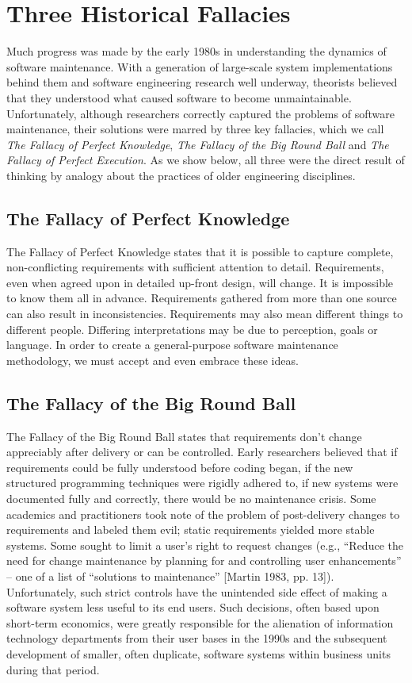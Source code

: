 \section{Three Historical Fallacies}

Much progress was made by the early 1980s in understanding the dynamics of software maintenance.  With a generation of large-scale system implementations behind them and software engineering research well underway, theorists believed that they understood what caused software to become unmaintainable.  Unfortunately, although researchers correctly captured the problems of software maintenance, their solutions were marred by three key fallacies, which we call \textit{The Fallacy of Perfect Knowledge}, \textit{The Fallacy of the Big Round Ball} and \textit{The Fallacy of Perfect Execution}.  As we show below, all three were the direct result of thinking by analogy about the practices of older engineering disciplines.


\subsection{The Fallacy of Perfect Knowledge}

The Fallacy of Perfect Knowledge states that it is possible to capture complete, non-conflicting requirements with sufficient attention to detail.  Requirements, even when agreed upon in detailed up-front design, will change.  It is impossible to know them all in advance.  Requirements gathered from more than one source can also result in inconsistencies.  Requirements may also mean different things to different people.  Differing interpretations may be due to perception, goals or language.  In order to create a general-purpose software maintenance methodology, we must accept and even embrace these ideas.


\subsection{The Fallacy of the Big Round Ball}

The Fallacy of the Big Round Ball states that requirements don't change appreciably after delivery or can be controlled.  Early researchers believed that if requirements could be fully understood before coding began, if the new structured programming techniques were rigidly adhered to, if new systems were documented fully and correctly, there would be no maintenance crisis.  Some academics and practitioners took note of the problem of post-delivery changes to requirements and labeled them evil; static requirements yielded more stable systems.  Some sought to limit a user's right to request changes (e.g., ``Reduce the need for change maintenance by planning for and controlling user enhancements'' -- one of a list of ``solutions to maintenance'' [Martin 1983, pp. 13]).  Unfortunately, such strict controls have the unintended side effect of making a software system less useful to its end users.  Such decisions, often based upon short-term economics, were greatly responsible for the alienation of information technology departments from their user bases in the 1990s and the subsequent development of smaller, often duplicate, software systems within business units during that period.



